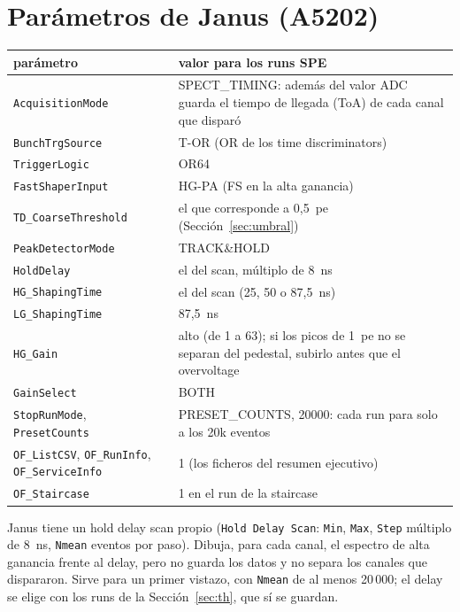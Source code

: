 \documentclass[11pt,a4paper]{article}
\begin{document}
\section{Parámetros de Janus (A5202)}
\label{sec:janus}

\begin{center}
\small
\begin{tabular}{p{} p{}}
\hline
parámetro & valor para los runs SPE \\
\hline
\texttt{AcquisitionMode} & SPECT\_TIMING: además del valor ADC guarda el tiempo de
llegada (ToA) de cada canal que disparó \\
\texttt{BunchTrgSource} & T-OR (OR de los time discriminators) \\
\texttt{TriggerLogic} & OR64 \\
\texttt{FastShaperInput} & HG-PA (FS en la alta ganancia) \\
\texttt{TD\_CoarseThreshold} & el que corresponde a 0,5~pe (Sección~\ref{sec:umbral}) \\
\texttt{PeakDetectorMode} & TRACK\&HOLD \\
\texttt{HoldDelay} & el del scan, múltiplo de 8~ns \\
\texttt{HG\_ShapingTime} & el del scan (25, 50 o 87,5~ns) \\
\texttt{LG\_ShapingTime} & 87,5~ns \\
\texttt{HG\_Gain} & alto (de 1 a 63); si los picos de 1~pe no se separan del
pedestal, subirlo antes que el overvoltage \\
\texttt{GainSelect} & BOTH \\
\texttt{StopRunMode}, \texttt{PresetCounts} & PRESET\_COUNTS, 20000: cada run
para solo a los 20k eventos \\
\texttt{OF\_ListCSV}, \texttt{OF\_RunInfo}, \texttt{OF\_ServiceInfo} & 1 (los
ficheros del resumen ejecutivo) \\
\texttt{OF\_Staircase} & 1 en el run de la staircase \\
\hline
\end{tabular}
\end{center}

\noindent Janus tiene un hold delay scan propio (\texttt{Hold Delay Scan}: \texttt{Min}, \texttt{Max},
\texttt{Step} múltiplo de 8~ns, \texttt{Nmean} eventos por paso). Dibuja, para cada canal, el
espectro de alta ganancia frente al delay, pero no guarda los datos y no
separa los canales que dispararon. Sirve para un primer vistazo, con \texttt{Nmean}
de al menos 20\,000; el delay se elige con los runs de la
Sección~\ref{sec:th}, que sí se guardan.
\end{document}
